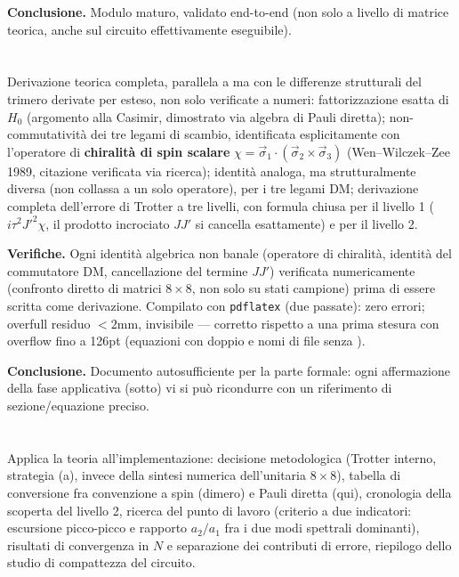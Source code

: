 \documentclass[11pt,a4paper]{article}
\begin{document}
\textbf{Conclusione.} Modulo maturo, validato end-to-end (non solo a livello di
matrice teorica, anche sul circuito effettivamente eseguibile).

\section*{\texttt{}}

Derivazione teorica completa, parallela a
\texttt{} ma con le differenze
strutturali del trimero derivate per esteso, non solo verificate a numeri:
fattorizzazione esatta di $H_0$ (argomento alla Casimir, dimostrato via algebra di
Pauli diretta); non-commutatività dei tre legami di scambio, identificata
esplicitamente con l'operatore di \textbf{chiralità di spin scalare}
$\chi=\vec\sigma_1\cdot(\vec\sigma_2\times\vec\sigma_3)$ (Wen--Wilczek--Zee 1989,
citazione verificata via ricerca); identità analoga, ma strutturalmente diversa (non
collassa a un solo operatore), per i tre legami DM; derivazione completa
dell'errore di Trotter a tre livelli, con formula chiusa per il livello 1
($i\tau^2J'^2\chi$, il prodotto incrociato $JJ'$ si cancella esattamente) e per il
livello 2.

\textbf{Verifiche.} Ogni identità algebrica non banale (operatore di chiralità,
identità del commutatore DM, cancellazione del termine $JJ'$) verificata
numericamente (confronto diretto di matrici $8\times8$, non solo su stati campione)
prima di essere scritta come derivazione. Compilato con \texttt{pdflatex} (due
passate): zero errori; overfull residuo $<2$mm, invisibile — corretto rispetto a una
prima stesura con overflow fino a 126pt (equazioni con doppio \texttt{}
e nomi di file senza \texttt{}).

\textbf{Conclusione.} Documento autosufficiente per la parte formale: ogni
affermazione della fase applicativa (sotto) vi si può ricondurre con un riferimento
di sezione/equazione preciso.

\section*{\texttt{}}

Applica la teoria all'implementazione: decisione metodologica (Trotter interno,
strategia (a), invece della sintesi numerica dell'unitaria $8\times8$), tabella di
conversione fra convenzione a spin (dimero) e Pauli diretta (qui), cronologia della
scoperta del livello 2, ricerca del punto di lavoro (criterio a due indicatori:
escursione picco-picco e rapporto $a_2/a_1$ fra i due modi spettrali dominanti),
risultati di convergenza in $N$ e separazione dei contributi di errore, riepilogo
dello studio di compattezza del circuito.
\end{document}
